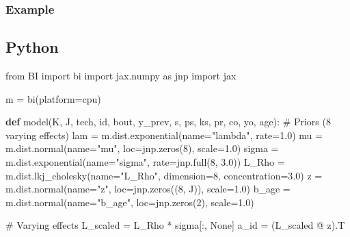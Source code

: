 \documentclass[
  letterpaper,
  DIV=11,
  numbers=noendperiod]{scrartcl}
\newenvironment{Shaded}{\begin{snugshade}}{\end{snugshade}}
\newcommand{\BuiltInTok}[1]{\textcolor[rgb]{0.00,0.23,0.31}{#1}}
\newcommand{\CommentTok}[1]{\textcolor[rgb]{0.37,0.37,0.37}{#1}}
\newcommand{\DecValTok}[1]{\textcolor[rgb]{0.68,0.00,0.00}{#1}}
\newcommand{\FloatTok}[1]{\textcolor[rgb]{0.68,0.00,0.00}{#1}}
\newcommand{\ImportTok}[1]{\textcolor[rgb]{0.00,0.46,0.62}{#1}}
\newcommand{\KeywordTok}[1]{\textcolor[rgb]{0.00,0.23,0.31}{\textbf{#1}}}
\newcommand{\NormalTok}[1]{\textcolor[rgb]{0.00,0.23,0.31}{#1}}
\newcommand{\OperatorTok}[1]{\textcolor[rgb]{0.37,0.37,0.37}{#1}}
\newcommand{\StringTok}[1]{\textcolor[rgb]{0.13,0.47,0.30}{#1}}
\newcommand{\VariableTok}[1]{\textcolor[rgb]{0.07,0.07,0.07}{#1}}
\begin{document}
\subsubsection{Example}\label{example-1}

\subsection{Python}

\begin{Shaded}
\begin{Highlighting}[]
\ImportTok{from}\NormalTok{ BI }\ImportTok{import}\NormalTok{ bi}
\ImportTok{import}\NormalTok{ jax.numpy }\ImportTok{as}\NormalTok{ jnp}
\ImportTok{import}\NormalTok{ jax}

\NormalTok{m }\OperatorTok{=}\NormalTok{ bi(platform}\OperatorTok{=}\StringTok{\textquotesingle{}cpu\textquotesingle{}}\NormalTok{)}

\KeywordTok{def}\NormalTok{ model(K, J, tech, }\BuiltInTok{id}\NormalTok{, bout, y\_prev, s, ps, ks, pr, co, yo, age):}
    \CommentTok{\# Priors (8 varying effects)}
\NormalTok{    lam   }\OperatorTok{=}\NormalTok{ m.dist.exponential(name}\OperatorTok{=}\StringTok{"lambda"}\NormalTok{, rate}\OperatorTok{=}\FloatTok{1.0}\NormalTok{)}
\NormalTok{    mu    }\OperatorTok{=}\NormalTok{ m.dist.normal(name}\OperatorTok{=}\StringTok{"mu"}\NormalTok{, loc}\OperatorTok{=}\NormalTok{jnp.zeros(}\DecValTok{8}\NormalTok{), scale}\OperatorTok{=}\FloatTok{1.0}\NormalTok{)}
\NormalTok{    sigma }\OperatorTok{=}\NormalTok{ m.dist.exponential(name}\OperatorTok{=}\StringTok{"sigma"}\NormalTok{, rate}\OperatorTok{=}\NormalTok{jnp.full(}\DecValTok{8}\NormalTok{, }\FloatTok{3.0}\NormalTok{))}
\NormalTok{    L\_Rho }\OperatorTok{=}\NormalTok{ m.dist.lkj\_cholesky(name}\OperatorTok{=}\StringTok{"L\_Rho"}\NormalTok{, dimension}\OperatorTok{=}\DecValTok{8}\NormalTok{, concentration}\OperatorTok{=}\FloatTok{3.0}\NormalTok{)}
\NormalTok{    z     }\OperatorTok{=}\NormalTok{ m.dist.normal(name}\OperatorTok{=}\StringTok{"z"}\NormalTok{, loc}\OperatorTok{=}\NormalTok{jnp.zeros((}\DecValTok{8}\NormalTok{, J)), scale}\OperatorTok{=}\FloatTok{1.0}\NormalTok{)}
\NormalTok{    b\_age }\OperatorTok{=}\NormalTok{ m.dist.normal(name}\OperatorTok{=}\StringTok{"b\_age"}\NormalTok{, loc}\OperatorTok{=}\NormalTok{jnp.zeros(}\DecValTok{2}\NormalTok{), scale}\OperatorTok{=}\FloatTok{1.0}\NormalTok{)}

    \CommentTok{\# Varying effects}
\NormalTok{    L\_scaled }\OperatorTok{=}\NormalTok{ L\_Rho }\OperatorTok{*}\NormalTok{ sigma[:, }\VariableTok{None}\NormalTok{]}
\NormalTok{    a\_id     }\OperatorTok{=}\NormalTok{ (L\_scaled }\OperatorTok{@}\NormalTok{ z).T}


\end{Highlighting}
\end{Shaded}
\end{document}
